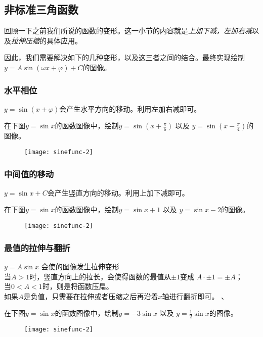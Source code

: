 \subsection*{非标准三角函数}
\label{subsec:Nonstandard Trigonometric Function}
回顾一下之前我们所说的函数的变形。这一小节的内容就是\emph{上加下减，左加右减}以及\emph{拉伸压缩}的具体应用。

因此，我们需要解决如下的几种变形，以及这三者之间的结合。最终实现绘制$y=A\sin (\omega x+\varphi)+C$的图像。

\subsubsection*{水平相位}
$y=\sin (x+\varphi)$会产生水平方向的移动。利用左加右减即可。
\begin{TaskBox}
在下图$y=\sin x$的函数图像中，绘制$y=\sin(x+\frac{\pi}{6})$ 以及 $y=\sin(x-\frac{\pi}{4})$的图像。
\begin{figure}[H]
\centering
\texttt{[image: sinefunc-2]}
\end{figure}

\end{TaskBox}


\subsubsection*{中间值的移动}
$y=\sin x +C$会产生竖直方向的移动。利用上加下减即可。
\begin{TaskBox}
在下图$y=\sin x$的函数图像中，绘制$y=\sin x+1$ 以及 $y=\sin x-2$的图像。
\begin{figure}[H]
\centering
\texttt{[image: sinefunc-2]}
\end{figure}
\end{TaskBox}

\subsubsection*{最值的拉伸与翻折}
$y=A\sin x$ 会使的图像发生拉伸变形\\
当$A>1$时，竖直方向上的拉长，会使得函数的最值从$\pm 1$变成 $A\cdot \pm 1=\pm A$；\\
当$0<A<1$时，则是将函数压扁。\\
如果$A$是负值，只需要在拉伸或者压缩之后再沿着$x$轴进行翻折即可。
、
\begin{TaskBox}
在下图$y=\sin x$的函数图像中，绘制$y=-3\sin x$ 以及 $y=\frac{1}{2}\sin x$的图像。
\begin{figure}[H]
\centering
\texttt{[image: sinefunc-2]}
\end{figure}
\end{TaskBox}

